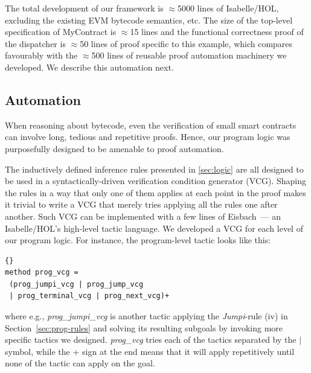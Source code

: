 \documentclass[sigplan,10pt,review]{acmart}\settopmatter{printfolios=true,printccs=false,printacmref=false}
\begin{document}

The total development of our framework is $\approx$5000 lines of Isabelle/HOL,
excluding the existing EVM bytecode semantics, etc.
The size of the top-level specification of MyContract is $\approx$15 lines
and the functional correctness proof of the dispatcher is
$\approx$50 lines of proof specific to this example, which compares
favourably with the $\approx$500 lines of reusable proof
automation machinery we developed.
We describe this automation next.





\subsection{Automation}
\label{sec:auto}

When reasoning about bytecode, even the verification of small smart contracts
can involve long, tedious and repetitive proofs.
Hence, our program logic was purposefully designed to be
amenable to proof automation.

The inductively defined inference rules presented in \autoref{sec:logic}
are all designed to be used in a syntactically-driven verification
condition generator (VCG).
Shaping the rules in a way that only one of them applies at each point in the
proof makes it trivial to write a VCG that merely tries applying all the rules
one after another.
Such VCG can be implemented with a few lines of Eisbach~\cite{Matichuk_MW_16}---
an Isabelle/HOL's high-level tactic language.
We developed a VCG for each level of our program logic.
For instance, the program-level tactic looks like this:
\begin{lstlisting}[language=Isar]{}
method prog_vcg =
 (prog_jumpi_vcg | prog_jump_vcg
 | prog_terminal_vcg | prog_next_vcg)+
\end{lstlisting}
where e.g., \textit{prog\_jumpi\_vcg} is another tactic applying the \textit{Jumpi}-rule (iv) 
in Section~\ref{sec:prog-rules} and solving its resulting subgoals by
invoking more specific tactics we designed.
\textit{prog\_vcg} tries each of the tactics separated by the $|$ symbol,
while the $+$ sign at the end means that it will apply repetitively until
none of the tactic can apply on the goal.
\end{document}
